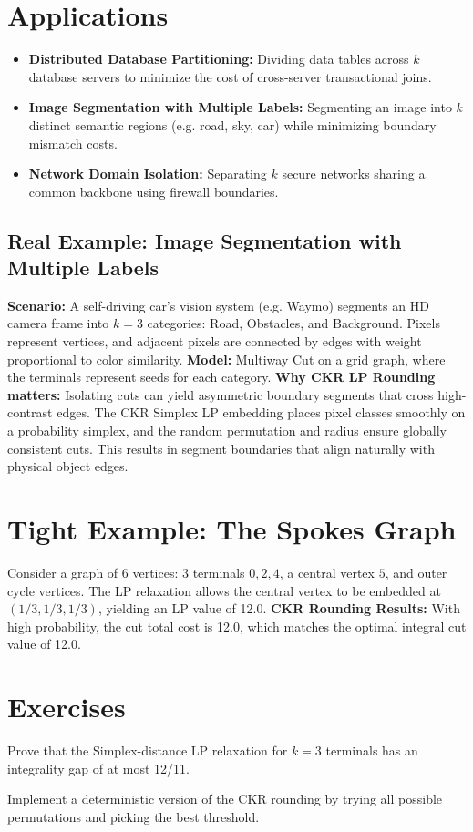 \section{Applications}
\begin{itemize}
    \item \textbf{Distributed Database Partitioning:} Dividing data tables across $k$ database servers to minimize the cost of cross-server transactional joins.
    \item \textbf{Image Segmentation with Multiple Labels:} Segmenting an image into $k$ distinct semantic regions (e.g. road, sky, car) while minimizing boundary mismatch costs.
    \item \textbf{Network Domain Isolation:} Separating $k$ secure networks sharing a common backbone using firewall boundaries.
\end{itemize}

\subsection*{Real Example: Image Segmentation with Multiple Labels}
\textbf{Scenario:} A self-driving car's vision system (e.g. Waymo) segments an HD camera frame into $k=3$ categories: Road, Obstacles, and Background. Pixels represent vertices, and adjacent pixels are connected by edges with weight proportional to color similarity.
\textbf{Model:} Multiway Cut on a grid graph, where the terminals represent seeds for each category.
\textbf{Why CKR LP Rounding matters:} Isolating cuts can yield asymmetric boundary segments that cross high-contrast edges. The CKR Simplex LP embedding places pixel classes smoothly on a probability simplex, and the random permutation and radius ensure globally consistent cuts. This results in segment boundaries that align naturally with physical object edges.

\section{Tight Example: The Spokes Graph}
Consider a graph of 6 vertices: 3 terminals $0, 2, 4$, a central vertex $5$, and outer cycle vertices. 
The LP relaxation allows the central vertex to be embedded at $(1/3, 1/3, 1/3)$, yielding an LP value of 12.0.
\textbf{CKR Rounding Results:} With high probability, the cut total cost is 12.0, which matches the optimal integral cut value of 12.0.

\section{Exercises}
\begin{exercise}
Prove that the Simplex-distance LP relaxation for $k=3$ terminals has an integrality gap of at most 12/11.
\end{exercise}
\begin{exercise}
Implement a deterministic version of the CKR rounding by trying all possible permutations and picking the best threshold.
\end{exercise}

